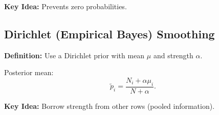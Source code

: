 \documentclass[11pt]{article}
\newcommand{\defn}[1]{\textcolor{mygreen}{\textbf{Definition:} #1}}
\newcommand{\idea}[1]{\textcolor{mygreen}{\textbf{Key Idea:} #1}}
\begin{document}
\idea{Prevents zero probabilities.}

\subsection*{Dirichlet (Empirical Bayes) Smoothing}
\defn{Use a Dirichlet prior with mean $\mu$ and strength $\alpha$.}

Posterior mean:
\[
\tilde p_i = \frac{N_i + \alpha \mu_i}{N + \alpha}.
\]

\idea{Borrow strength from other rows (pooled information).}



\end{document}
